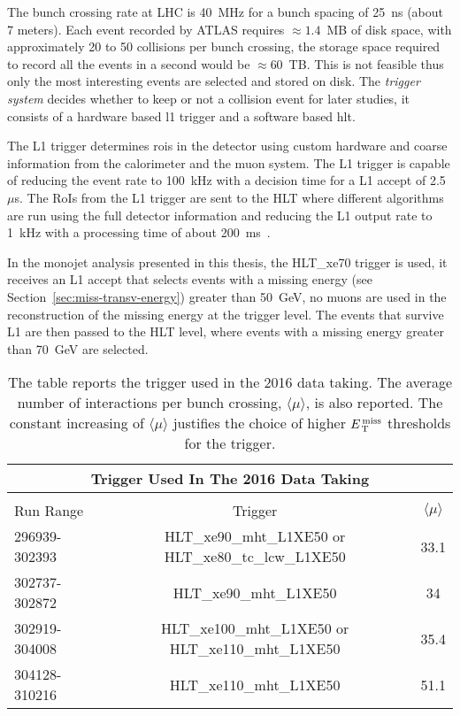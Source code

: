 The bunch crossing rate at LHC is 40~MHz for a bunch spacing of 25~ns (about 7
meters). Each event recorded by ATLAS requires $\approx 1.4$~MB of disk space,
with approximately 20 to 50 collisions per bunch crossing, the storage space
required to record all the events in a second would be $\approx 60$~TB. This is
not feasible thus only the most interesting events are selected and stored on
disk. The \emph{trigger system} decides whether to keep or not a collision event
for later studies, it consists of a hardware based \gls{l1} trigger and a
software based \gls{hlt}.

The L1 trigger determines \gls{rois} in the detector using custom hardware and
coarse information from the calorimeter and the muon system. The L1 trigger is
capable of reducing the event rate to 100~kHz with a decision time for a L1
accept of 2.5~$\mu$s. The RoIs from the L1 trigger are sent to the HLT where
different algorithms are run using the full detector information and reducing
the L1 output rate to 1~kHz with a processing time of about
200~ms~\cite{trigger}. %

In the monojet analysis presented in this thesis, the HLT\_xe70 trigger is used,
it receives an L1 accept that selects events with a missing energy (see
Section~\ref{sec:miss-transv-energy}) greater than 50~GeV, no muons are used in
the reconstruction of the missing energy at the trigger level. The events that
survive L1 are then passed to the HLT level, where events with a missing energy
greater than 70~GeV are selected.
\begin{table}[!hb]
  \centering
  \begin{tabular}{lcc}
    \toprule
    \multicolumn{3}{c}{Trigger Used In The 2016 Data Taking} \\
    \midrule \midrule \\
    Run Range & Trigger & $\langle \mu \rangle$ \\
    296939-302393 & HLT\_xe90\_mht\_L1XE50 or HLT\_xe80\_tc\_lcw\_L1XE50 & 33.1 \\
    302737-302872 & HLT\_xe90\_mht\_L1XE50 & 34 \\
    302919-304008 & HLT\_xe100\_mht\_L1XE50 or HLT\_xe110\_mht\_L1XE50 & 35.4 \\
    304128-310216 & HLT\_xe110\_mht\_L1XE50 & 51.1 \\
    \bottomrule
  \end{tabular}
  \caption{The table reports the trigger used in the 2016 data taking. The
    average number of interactions per bunch crossing, $\langle \mu \rangle$, is
  also reported. The constant increasing of $\langle \mu \rangle$ justifies the
  choice of higher $E_\mathrm{\, T}^\mathrm{\, miss}$ thresholds for the trigger.}
  \label{tab:trigger_periods}
\end{table}
